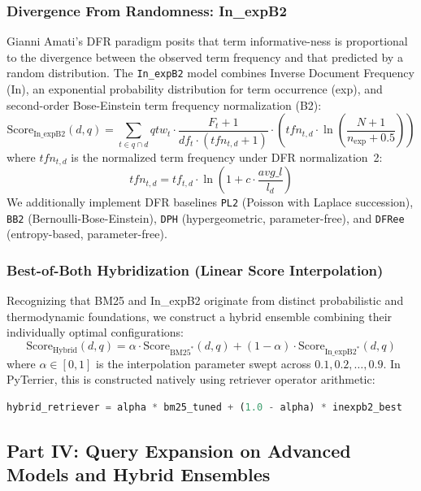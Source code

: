 \documentclass[10pt, a4paper]{article}
\begin{document}
\subsubsection{Divergence From Randomness: In\_expB2}
Gianni Amati's DFR paradigm posits that term informative-ness is proportional to the divergence between the observed term frequency and that predicted by a random distribution. The \texttt{In\_expB2} model combines Inverse Document Frequency (In), an exponential probability distribution for term occurrence (exp), and second-order Bose-Einstein term frequency normalization (B2):
\begin{equation}
\text{Score}_{\text{In\_expB2}}(d, q) = \sum_{t \in q \cap d} qtw_t \cdot \frac{F_t + 1}{df_t \cdot (tfn_{t,d} + 1)} \cdot \left( tfn_{t,d} \cdot \ln\left(\frac{N + 1}{n_{\text{exp}} + 0.5}\right) \right)
\end{equation}
where $tfn_{t,d}$ is the normalized term frequency under DFR normalization~2:
\begin{equation}
tfn_{t,d} = tf_{t,d} \cdot \ln\left(1 + c \cdot \frac{avg\_l}{l_d}\right)
\end{equation}
We additionally implement DFR baselines \texttt{PL2} (Poisson with Laplace succession), \texttt{BB2} (Bernoulli-Bose-Einstein), \texttt{DPH} (hypergeometric, parameter-free), and \texttt{DFRee} (entropy-based, parameter-free).

\subsubsection{Best-of-Both Hybridization (Linear Score Interpolation)}
Recognizing that BM25 and In\_expB2 originate from distinct probabilistic and thermodynamic foundations, we construct a hybrid ensemble combining their individually optimal configurations:
\begin{equation}
\text{Score}_{\text{Hybrid}}(d, q) = \alpha \cdot \text{Score}_{\text{BM25}^*}(d, q) + (1 - \alpha) \cdot \text{Score}_{\text{In\_expB2}^*}(d, q)
\label{eq:hybrid}
\end{equation}
where $\alpha \in [0, 1]$ is the interpolation parameter swept across $0.1, 0.2, \dots, 0.9$. In PyTerrier, this is constructed natively using retriever operator arithmetic:
\begin{lstlisting}[language=Python]
hybrid_retriever = alpha * bm25_tuned + (1.0 - alpha) * inexpb2_best
\end{lstlisting}

\subsection{Part IV: Query Expansion on Advanced Models and Hybrid Ensembles}
\label{sec:impl_part4}
\end{document}
